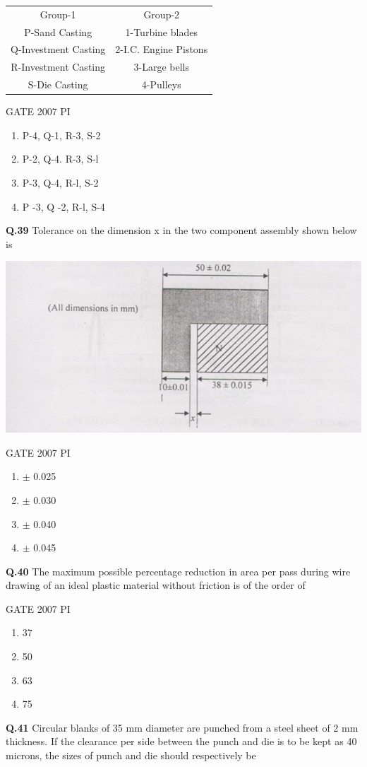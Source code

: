 \documentclass[journal,12pt,onecolumn]{exam}
\theoremstyle{remark}
\begin{document}
  
\begin{tabular}{c|c}
    Group-1     & Group-2 \\
   P-Sand Casting & 1-Turbine blades \\
   Q-Investment Casting & 2-I.C. Engine Pistons \\
   R-Investment Casting & 3-Large bells \\
   S-Die Casting & 4-Pulleys
   \end{tabular}
   \hfill{GATE 2007 PI}
   \begin{enumerate}
       \item P-4, Q-1, R-3, S-2
       \item P-2, Q-4. R-3, S-l
       \item P-3, Q-4, R-l, S-2
       \item P -3, Q -2, R-l, S-4
   \end{enumerate}
   \noindent
   \textbf{Q.39}
   	Tolerance on the dimension x in the two component assembly shown below is


\includegraphics[width=0.5\linewidth]{figs/Q.39.png}
       
   \hfill{GATE 2007 PI}
   \begin{enumerate}
       \item $\pm$ 0.025
       \item $\pm$ 0.030
       \item $\pm$ 0.040
       \item $\pm$ 0.045
\end{enumerate}
\noindent
\textbf{Q.40}
The maximum possible percentage reduction in area per pass during wire drawing of an ideal plastic material without friction is of the order of

\hfill{GATE 2007 PI}
\begin{enumerate}
    \item 37
    \item 50
    \item 63
    \item 75
\end{enumerate}
\noindent
\textbf{Q.41}
Circular blanks of 35 mm diameter are punched from a steel sheet of 2 mm thickness. If the clearance per side between the punch and die is to be kept as 40 microns, the sizes of punch and die should respectively be
\end{document}
